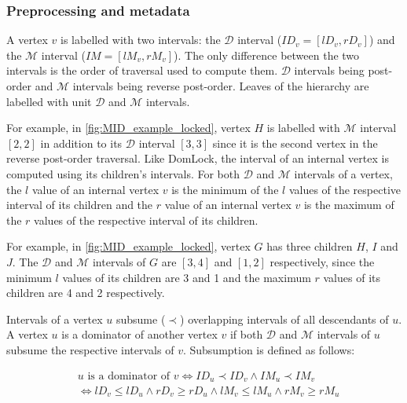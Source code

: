 \subsubsection{Preprocessing and metadata}

A vertex $v$ is labelled with two intervals: the $\mathcal{D}$ interval ($\mathit{ID}_v = [\mathit{lD}_v, \mathit{rD}_v]$) and the $\mathcal{M}$ interval ($\mathit{IM} = [\mathit{lM}_v, \mathit{rM}_v]$). The only difference between the two intervals is the order of traversal used to compute them. $\mathcal{D}$ intervals being post-order and $\mathcal{M}$ intervals being reverse post-order. Leaves of the hierarchy are labelled with unit $\mathcal{D}$ and $\mathcal{M}$ intervals. 

For example, in \cref{fig:MID_example_locked}, vertex $H$ is labelled with $\mathcal{M}$ interval $[2,2]$ in addition to its $\mathcal{D}$ interval $[3,3]$ since it is the second vertex in the reverse post-order traversal. Like DomLock, the interval of an internal vertex is computed using its children's intervals. For both $\mathcal{D}$ and $\mathcal{M}$ intervals of a vertex, the $l$ value of an internal vertex $v$ is the minimum of the $l$ values of the respective interval of its children and the $r$ value of an internal vertex $v$ is the maximum of the $r$ values of the respective interval of its children.

For example, in \cref{fig:MID_example_locked}, vertex $G$ has three children $H$, $I$ and $J$. The $\mathcal{D}$ and $\mathcal{M}$ intervals of $G$ are $[3,4]$ and $[1,2]$ respectively, since the minimum $l$ values of its children are 3 and 1 and the maximum $r$ values of its children are 4 and 2 respectively.

Intervals of a vertex $u$ subsume ($\prec$) overlapping intervals of all descendants of $u$. A vertex $u$ is a dominator of another vertex $v$ if both $\mathcal{D}$ and $\mathcal{M}$ intervals of $u$ subsume the respective intervals of $v$.
Subsumption is defined as follows:

\begin{equation*}
    \begin{split}
        & u \text{ is a dominator of } v \iff ID_u \prec ID_v \land IM_u \prec IM_v
        \\ & \iff \mathit{lD}_v \leq \mathit{lD}_u \land \mathit{rD}_v \geq \mathit{rD}_u \land \mathit{lM}_v \leq \mathit{lM}_u \land \mathit{rM}_v \geq \mathit{rM}_u
    \end{split}
\end{equation*}

